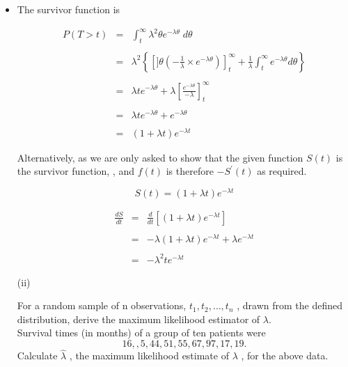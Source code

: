 \documentclass[a4paper,12pt]{article}
\begin{document}
\begin{itemize}
\item The survivor function is 

\begin{eqnarray*}
P(T > t) &=& \int^{\infty}_{t} \lambda^2 \theta e^{-\lambda\theta}  \;d \theta\\
& & \\
&=& \lambda^2 \left\{ \left[]  \theta \left( -\frac{1}{\lambda} \times e^{-\lambda\theta} \right) \right]^{\infty}_{t} + \frac{1}{\lambda} \int^{\infty}_{t} e^{-\lambda\theta} d \theta \right\}\\
& & \\
&=& \lambda t e^{-\lambda\theta}  + \lambda \left[ \frac{e^{-\lambda\theta}}{-\lambda} \right]^{\infty}_{t}\\
& & \\
&=& \lambda t e^{-\lambda\theta} + e^{-\lambda\theta} \\
& & \\
&=& (1 + \lambda t ) e^{ - \lambda t}
\end{eqnarray*}

\newpage
\large 

Alternatively, as we are only asked to show that the given function $S(t)$ is the survivor function, , and $f(t)$ is therefore $-S^{\prime}(t)$ as required.

\[S ( t ) = (1 + \lambda t ) e^{ - \lambda t}\]

\begin{eqnarray*}
\frac{dS}{dt} &=& \frac{d}{dt} \left[(1 + \lambda t ) e^{ - \lambda t}  \right]\\
& & \\
&=& -\lambda (1 + \lambda t) e^{-\lambda t} + \lambda e^{-\lambda t}\\
& & \\
&=& -\lambda^2 t e^{-\lambda t}
\end{eqnarray*}

\large
\newpage
\begin{framed}
\large
(ii)

For a random sample of n observations, $t_1 , t_2  , \ldots , t_n$ , drawn from the defined
distribution, derive the maximum likelihood estimator of $\lambda$.
\\
Survival times (in months) of a group of ten patients were
\[16, , 5, 44, 51, 55, 67, 97, 17, 19.\]
Calculate $\hat{\lambda}$  , the maximum likelihood estimate of $\lambda$ , for the above data.
\end{framed}


\end{itemize}
\end{document}
